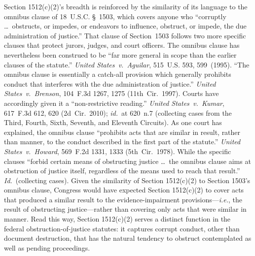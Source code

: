 Section 1512(c)(2)'s breadth is reinforced by the similarity of its language to the omnibus clause of 18~U.S.C. \S~1503, which covers anyone who ``corruptly \dots\ obstructs, or impedes, or endeavors to influence, obstruct, or impede, the due administration of justice.'' That clause of Section~1503 follows two more specific clauses that protect jurors, judges, and court officers.
The omnibus clause has nevertheless been construed to be ``far more general in scope than the earlier clauses of the statute.''
\textit{United States~v.\ Aguilar}, 515~U.S. 593, 599~(1995).
``The omnibus clause is essentially a catch-all provision which generally prohibits conduct that interferes with the due administration of justice.''
\textit{United States~v.\ Brenson}, 104~F.3d 1267, 1275 (11th~Cir.~1997).
Courts have accordingly given it a ``non-restrictive reading.''
\textit{United States~v.\ Kumar}, 617~F.3d 612, 620 (2d~Cir.~2010); \textit{id.}~at 620~n.7 (collecting cases from the Third, Fourth, Sixth, Seventh, and Eleventh Circuits).
As one court has explained, the omnibus clause ``prohibits acts that are similar in result, rather than manner, to the conduct described in the first part of the statute.''
\textit{United States~v.\ Howard}, 569~F.2d 1331, 1333 (5th~Cir.~1978).
While the specific clauses ``forbid certain means of obstructing justice \dots\ the omnibus clause aims at obstruction of justice itself, regardless of the means used to reach that result.''
\textit{Id.}~(collecting cases).
Given the similarity of Section 1512(c)(2) to Section 1503's omnibus clause, Congress would have expected Section 1512(c)(2) to cover acts that produced a similar result to the evidence-impairment provisions---\textit{i.e.}, the result of obstructing justice---rather than covering only acts that were similar in manner.
Read this way, Section 1512(c)(2) serves a distinct function in the federal obstruction-of-justice statutes: it captures corrupt conduct, other than document destruction, that has the natural tendency to obstruct contemplated as well as pending proceedings.

